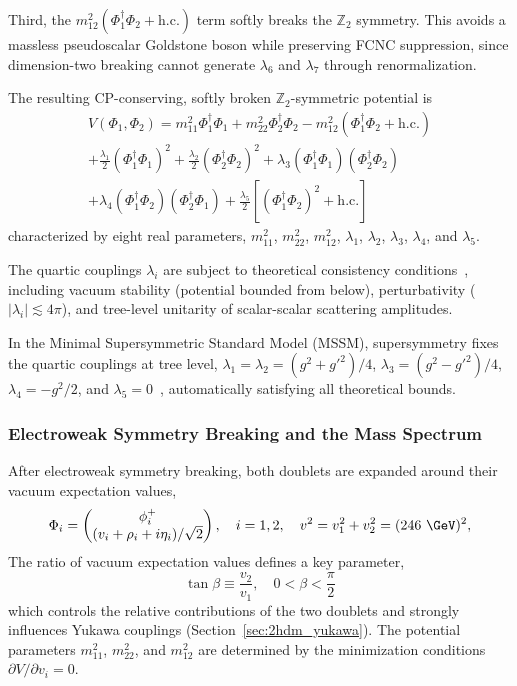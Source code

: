 Third, the $m_{12}^2(\Phi_1^\dagger\Phi_2 + \text{h.c.})$ term softly breaks the $\mathbb{Z}_2$ symmetry. This avoids a massless pseudoscalar Goldstone boson while preserving FCNC suppression, since dimension-two breaking cannot generate $\lambda_6$ and $\lambda_7$ through renormalization.

The resulting CP-conserving, softly broken $\mathbb{Z}_2$-symmetric potential is
\begin{gather}
V(\Phi_1, \Phi_2) = m_{11}^2 \Phi_1^\dagger\Phi_1 + m_{22}^2 \Phi_2^\dagger\Phi_2 - m_{12}^2(\Phi_1^\dagger\Phi_2 + \text{h.c.}) \nonumber\\
+ \frac{\lambda_1}{2}(\Phi_1^\dagger\Phi_1)^2 + \frac{\lambda_2}{2}(\Phi_2^\dagger\Phi_2)^2 + \lambda_3(\Phi_1^\dagger\Phi_1)(\Phi_2^\dagger\Phi_2) \nonumber\\
+ \lambda_4(\Phi_1^\dagger\Phi_2)(\Phi_2^\dagger\Phi_1) + \frac{\lambda_5}{2}\left[(\Phi_1^\dagger\Phi_2)^2 + \text{h.c.}\right]
\label{eq:2hdm_potential}
\end{gather}
characterized by eight real parameters, $m_{11}^2$, $m_{22}^2$, $m_{12}^2$, $\lambda_1$, $\lambda_2$, $\lambda_3$, $\lambda_4$, and $\lambda_5$.

The quartic couplings $\lambda_i$ are subject to theoretical consistency conditions~\cite{Branco:2011iw}, including vacuum stability (potential bounded from below), perturbativity ($|\lambda_i| \lesssim 4\pi$), and tree-level unitarity of scalar-scalar scattering amplitudes.

In the Minimal Supersymmetric Standard Model (MSSM), supersymmetry fixes the quartic couplings at tree level, $\lambda_1 = \lambda_2 = (g^2 + g'^2)/4$, $\lambda_3 = (g^2 - g'^2)/4$, $\lambda_4 = -g^2/2$, and $\lambda_5 = 0$~\cite{Martin:1997ns}, automatically satisfying all theoretical bounds.

\subsubsection{Electroweak Symmetry Breaking and the Mass Spectrum}

After electroweak symmetry breaking, both doublets are expanded around their vacuum expectation values,
\begin{equation}
\Phi_i =
\begin{pmatrix}
\phi_i^+ \\
(v_i + \rho_i + i\eta_i) / \sqrt{2}
\end{pmatrix},
\quad i = 1,2,
\quad v^2 = v_1^2 + v_2^2 = (246~\GeV)^2,
\label{eq:2hdm_vevs}
\end{equation}
The ratio of vacuum expectation values defines a key parameter,
\begin{equation}
\tan\beta \equiv \frac{v_2}{v_1}, \quad 0 < \beta < \frac{\pi}{2}
\label{eq:tanbeta}
\end{equation}
which controls the relative contributions of the two doublets and strongly influences Yukawa couplings (Section~\ref{sec:2hdm_yukawa}). The potential parameters $m_{11}^2$, $m_{22}^2$, and $m_{12}^2$ are determined by the minimization conditions $\partial V/\partial v_i = 0$.

